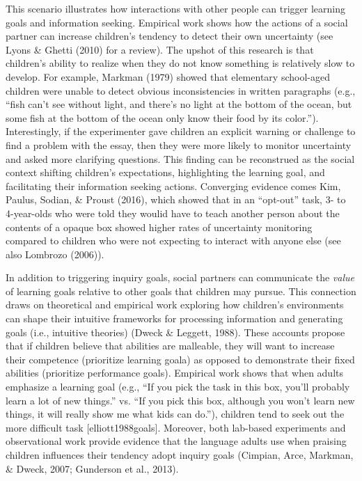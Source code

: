 \documentclass[oneside]{report}
\begin{document}
This scenario illustrates how interactions with other people can trigger
learning goals and information seeking. Empirical work shows how the
actions of a social partner can increase children's tendency to detect
their own uncertainty (see Lyons \& Ghetti (2010) for a review). The
upshot of this research is that children's ability to realize when they
do not know something is relatively slow to develop. For example,
Markman (1979) showed that elementary school-aged children were unable
to detect obvious inconsistencies in written paragraphs (e.g., ``fish
can't see without light, and there's no light at the bottom of the
ocean, but some fish at the bottom of the ocean only know their food by
its color.''). Interestingly, if the experimenter gave children an
explicit warning or challenge to find a problem with the essay, then
they were more likely to monitor uncertainty and asked more clarifying
questions. This finding can be reconstrued as the social context
shifting children's expectations, highlighting the learning goal, and
facilitating their information seeking actions. Converging evidence
comes Kim, Paulus, Sodian, \& Proust (2016), which showed that in an
``opt-out'' task, 3- to 4-year-olds who were told they woulid have to
teach another person about the contents of a opaque box showed higher
rates of uncertainty monitoring compared to children who were not
expecting to interact with anyone else (see also Lombrozo (2006)).

In addition to triggering inquiry goals, social partners can communicate
the \emph{value} of learning goals relative to other goals that children
may pursue. This connection draws on theoretical and empirical work
exploring how children's environments can shape their intuitive
frameworks for processing information and generating goals (i.e.,
intuitive theories) (Dweck \& Leggett, 1988). These accounts propose
that if children believe that abilities are malleable, they will want to
increase their competence (prioritize learning goala) as opposed to
demonstrate their fixed abilities (prioritize performance goals).
Empirical work shows that when adults emphasize a learning goal (e.g.,
``If you pick the task in this box, you'll probably learn a lot of new
things.'' vs. ``If you pick this box, although you won't learn new
things, it will really show me what kids can do.''), children tend to
seek out the more difficult task {[}elliott1988goals{]}. Moreover, both
lab-based experiments and observational work provide evidence that the
language adults use when praising children influences their tendency
adopt inquiry goals (Cimpian, Arce, Markman, \& Dweck, 2007; Gunderson
et al., 2013).
\end{document}
